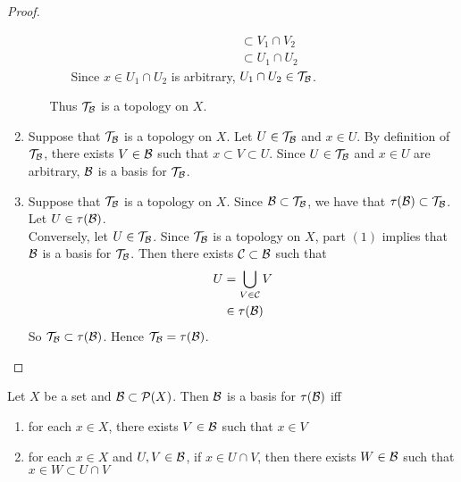 \documentclass{book}
\begin{document}
\begin{proof}
\begin{enumerate}
\begin{itemize}
\begin{itemize}
\begin{align*}
					& \subset V_1 \cap V_2 \\
					& \subset U_1 \cap U_2
				\end{align*}
				Since $x \in U_1 \cap U_2$ is arbitrary, $U_1 \cap U_2 \in \mathcal{T}_{\mathcal{B}}$. 
			\end{itemize}
			Thus $\mathcal{T}_{\mathcal{B}}$ is a topology on $X$.
		\end{itemize}
		\item Suppose that $\mathcal{T}_{\mathcal{B}}$ is a topology on $X$. Let $U \in \mathcal{T}_{\mathcal{B}}$ and $x \in U$. By definition of $\mathcal{T}_{\mathcal{B}}$, there exists $V \in \mathcal{B}$ such that $x \subset V \subset U$. Since $U \in \mathcal{T}_{\mathcal{B}}$ and $x \in U$ are arbitrary, $\mathcal{B}$ is a basis for $\mathcal{T}_{\mathcal{B}}$.
		\item Suppose that $\mathcal{T}_{\mathcal{B}}$ is a topology on $X$. Since $\mathcal{B} \subset \mathcal{T}_{\mathcal{B}}$, we have that $\tau(\mathcal{B}) \subset \mathcal{T}_{\mathcal{B}}$. Let $U \in \tau(\mathcal{B})$. \\
		Conversely, let $U \in \mathcal{T}_{\mathcal{B}}$. Since $\mathcal{T}_{\mathcal{B}}$ is a topology on $X$, part $(1)$ implies that $\mathcal{B}$ is a basis for $\mathcal{T}_{\mathcal{B}}$. Then there exists $\mathcal{C} \subset \mathcal{B}$ such that 
		\begin{align*}
			U 
			& = \bigcup\limits_{V \in \mathcal{C}} V \\
			& \in \tau(\mathcal{B})
		\end{align*}
		So $\mathcal{T}_{\mathcal{B}} \subset \tau(\mathcal{B})$. Hence $\mathcal{T}_{\mathcal{B}} = \tau(\mathcal{B})$.
	\end{enumerate}
	\end{proof}
 
	\begin{ex} 
		Let $X$ be a set and $\mathcal{B} \subset \mathcal{P}(X)$. Then $\mathcal{B}$ is a basis for $\tau(\mathcal{B})$ iff 
		\begin{enumerate}
			\item for each $x \in X$, there exists $V \in \mathcal{B}$ such that $x \in V$
			\item for each $x \in X$ and $U, V \in \mathcal{B}$, if $x \in U \cap V$, then there exists $W \in \mathcal{B}$ such that $x \in W \subset U \cap V$
		\end{enumerate} 
	\end{ex}
\end{document}
